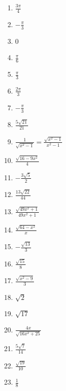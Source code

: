 \begin{enumerate}
	\item $\frac{3\pi}{4}$
	\item $-\frac{\pi}{3}$
	\item 0
	\item $\frac{\pi}{6}$
	\item $\frac{\pi}{3}$
	\item $\frac{2\pi}{3}$
	\item $-\frac{\pi}{3}$
    \item $\frac{5\sqrt{21}}{21}$
    \item $\frac{1}{\sqrt{x^2-1}} = \frac{\sqrt{x^2-1}}{x^2-1}$
    \item $\frac{\sqrt{16-9x^2}}{4}$
    \item $-\frac{3\sqrt{5}}{2}$
    \item $\frac{13\sqrt{22}}{44}$
    \item $\frac{\sqrt{49x^2+1}}{49x^2+1}$
    \item $\frac{\sqrt{64-x^2}}{x}$
    \item $-\frac{\sqrt{13}}{3}$
    \item $\frac{\sqrt{15}}{8}$
    \item $\frac{\sqrt{x^2-9}}{3}$
    \item $\sqrt{2}$
    \item $\sqrt{17}$
    \item $\frac{4x}{\sqrt{16x^2+25}}$
    \item $\frac{5\sqrt{7}}{14}$
    \item $\frac{\sqrt{19}}{10}$
    \item $\frac{1}{8}$
\end{enumerate}
